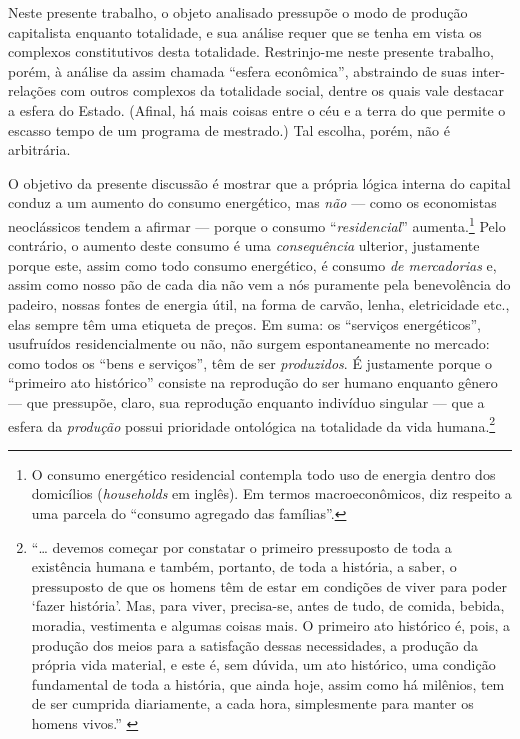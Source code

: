 Neste presente trabalho, o objeto analisado pressupõe o modo de produção capitalista enquanto totalidade, e sua análise requer que se tenha em vista os complexos constitutivos desta totalidade. Restrinjo-me neste presente trabalho, porém, à análise da assim chamada ``esfera econômica'', abstraindo de suas inter-relações com outros complexos da totalidade social, dentre os quais vale destacar a esfera do Estado. (Afinal, há mais coisas entre o céu e a terra do que permite o escasso tempo de um programa de mestrado.) Tal escolha, porém, não é arbitrária.

O objetivo da presente discussão é mostrar que a própria lógica interna do capital conduz a um aumento do consumo energético, mas \emph{não} --- como os economistas neoclássicos tendem a afirmar --- porque o consumo ``\emph{residencial}'' aumenta.\footnote{O consumo energético residencial contempla todo uso de energia dentro dos domicílios (\emph{households} em inglês). Em termos macroeconômicos, diz respeito a uma parcela do ``consumo agregado das famílias''.} Pelo contrário, o aumento deste consumo é uma \emph{consequência} ulterior, justamente porque este, assim como todo consumo energético, é consumo \emph{de mercadorias} e, assim como nosso pão de cada dia não vem a nós puramente pela benevolência do padeiro, nossas fontes de energia útil, na forma de carvão, lenha, eletricidade etc., elas sempre têm uma etiqueta de preços. Em suma: os ``serviços energéticos'', usufruídos residencialmente ou não, não surgem espontaneamente no mercado: como todos os ``bens e serviços'', têm de ser \emph{produzidos}. É justamente porque o ``primeiro ato histórico'' consiste na reprodução do ser humano enquanto gênero --- que pressupõe, claro, sua reprodução enquanto indivíduo singular --- que a esfera da \emph{produção} possui prioridade ontológica na totalidade da vida humana.\footnote{``\ldots{} devemos começar por constatar o primeiro pressuposto de toda a existência humana e também, portanto, de toda a história, a saber, o pressuposto de que os homens têm de estar em condições de viver para poder `fazer história'. Mas, para viver, precisa-se, antes de tudo, de comida, bebida, moradia, vestimenta e algumas coisas mais. O primeiro ato histórico é, pois, a produção dos meios para a satisfação dessas necessidades, a produção da própria vida material, e este é, sem dúvida, um ato histórico, uma condição fundamental de toda a história, que ainda hoje, assim como há milênios, tem de ser cumprida diariamente, a cada hora, simplesmente para manter os homens vivos.'' \parencite[p. 32-3]{Marx2007}}

